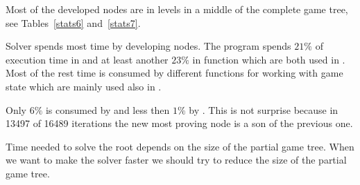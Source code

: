 Most of the developed nodes are in levels in a middle of the complete game tree, see
Tables~\ref{stats6} and~\ref{stats7}. 

Solver spends most time by developing nodes. The program spends $21\%$ of
execution time in  and at least another $23\%$ in
 function which are both used in .  Most of
the rest time is consumed by different functions for working with game state
which are mainly used also in .

Only $6\%$ is consumed by  and less then $1\%$ by
. This is not surprise because in 13497 of 16489
iterations the new most proving node is a son of the previous one.

Time needed to solve the root depends on the size of the partial game tree.
When we want to make the solver faster we should try to reduce the size of the
partial game tree.

